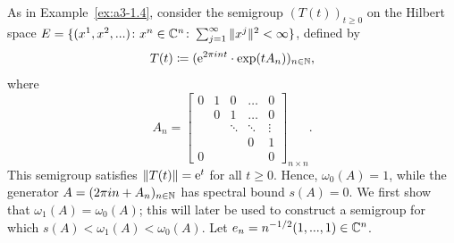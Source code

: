 \begin{example}\label{ex:a4-1.6} 
As in Example~\ref{ex:a3-1.4}, consider the semigroup $ (T(t))_{t \geq 0} $ on the Hilbert space $ E = \{(x^1, x^2, ...) \colon x^n \in \mathbb{C}^n\colon\sum_{j=1}^{\infty} \|x^j\|^2 < \infty\} $, defined by 
\[{
T(t) \coloneq  (\mathrm{e}^{2\pi i n t} \cdot \exp(t A_n))_{n \in \mathbb{N}}
},\]
where
\[
A_n =
\begin{bmatrix}
0 & 1 & 0 & \dots & 0 \\
& 0 & 1 & \dots & 0 \\
& & \ddots & \ddots & \vdots \\
& & & 0 & 1 \\
0 & & & & 0
\end{bmatrix}_{n \times n}.
\]
This semigroup satisfies $ \|T(t)\| = \mathrm{e}^{t} $ for all $t \geq 0$. Hence, $ \omega_{0}(A) = 1 $, while the generator $ A = (2\pi i n + A_n)_{n \in \mathbb{N}} $ has spectral bound $ s(A) = 0 $. 
We first show that $ \omega_1(A) = \omega_{0}(A) $; this will later be used to construct a semigroup for which $ s(A) < \omega_1(A) < \omega_{0}(A) $. 
Let $ e_n = n^{-1/2} (1, ..., 1) \in \mathbb{C}^n $. 
 

\end{example}
